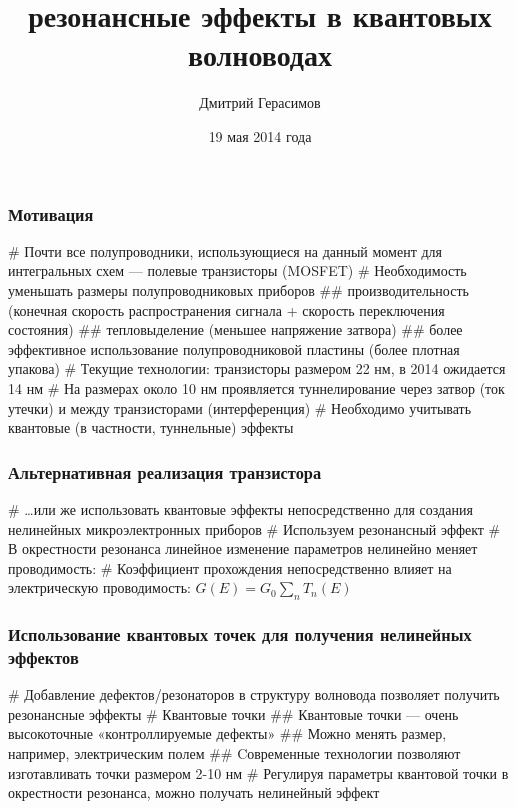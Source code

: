 \documentclass{beamer}
\title[]{\todo{Метод R-матриц и} резонансные эффекты в квантовых волноводах}
\author{Дмитрий Герасимов}
\institute[ИТМО]{Университет ИТМО}
\date{19 мая 2014 года}
\begin{document}
\maketitle

\begin{frame}[fragile]
\frametitle{Мотивация}
\begin{easylist}[itemize]
# Почти все полупроводники, использующиеся на данный момент для интегральных схем — полевые транзисторы (MOSFET)
# Необходимость уменьшать размеры полупроводниковых приборов
## производительность (конечная скорость распространения сигнала + скорость переключения состояния)
## тепловыделение (меньшее напряжение затвора)
## более эффективное использование полупроводниковой пластины (более плотная упакова)
# Текущие технологии: транзисторы размером 22 нм, в 2014 ожидается 14 нм
# На размерах около 10 нм проявляется туннелирование через затвор (ток утечки) и между транзисторами (интерференция)
# Необходимо учитывать квантовые (в частности, туннельные) эффекты
\end{easylist}
\end{frame}

\begin{frame}[fragile]
\frametitle{Альтернативная реализация транзистора}
\begin{easylist}[itemize]
# \dots или же использовать квантовые эффекты непосредственно для создания нелинейных микроэлектронных приборов
# Используем резонансный эффект 
# В окрестности резонанса линейное изменение параметров нелинейно меняет проводимость: 
# Коэффициент прохождения непосредственно влияет на электрическую проводимость: $G(E) = G_0 \sum\limits_n T_n(E)$ 
\end{easylist}
\end{frame}

\begin{frame}[fragile]
\frametitle{Использование квантовых точек для получения нелинейных эффектов}
\begin{easylist}[itemize]
# Добавление дефектов/резонаторов в структуру волновода позволяет получить резонансные эффекты
# Квантовые точки
## Квантовые точки — очень высокоточные «контроллируемые дефекты»
## Можно менять размер, например, электрическим полем 
## Cовременные технологии позволяют изготавливать точки размером 2-10 нм
# Регулируя параметры квантовой точки в окрестности резонанса, можно получать нелинейный эффект
\end{easylist}
\end{frame}
\end{document}
